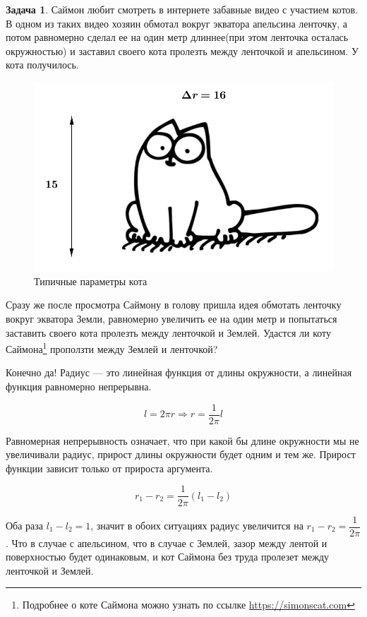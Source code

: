 \documentclass[pdftex, 12pt, a4paper]{article}
\theoremstyle{definition} %
\newtheorem{problem}{Задача}
\numberwithin{problem}{section}
\numberwithin{blits}{section}
\begin{document}
\begin{problem}
Саймон любит смотреть в интернете забавные видео с участием котов. В одном из таких видео хозяин обмотал вокруг экватора апельсина ленточку, а потом равномерно сделал ее на один метр длиннее(при этом ленточка осталась окружностью) и заставил своего кота пролезть между ленточкой и апельсином. У кота получилось.

\begin{figure}[H]
\begin{center}
\includegraphics[scale=1]{cat}
\caption{Типичные параметры кота}
\end{center}
\end{figure}

Сразу же после просмотра Саймону в голову пришла идея обмотать ленточку вокруг экватора Земли, равномерно увеличить ее на один метр и попытаться заставить своего кота пролезть между ленточкой и Землей. Удастся ли коту Саймона\footnote{Подробнее о коте Саймона можно узнать по ссылке \url{https://simonscat.com}} проползти между Землей и ленточкой?

\begin{sol}
Конечно да! Радиус --- это линейная функция от длины окружности, а линейная функция равномерно непрерывна.

\[l = 2 \pi r \Rightarrow r = \frac{1}{2 \pi} l \]

Равномерная непрерывность означает, что при какой бы длине окружности мы не увеличивали радиус, прирост длины окружности будет одним и тем же. Прирост функции зависит только от прироста аргумента.

\[r_1 - r_2 = \frac{1}{2\pi} (l_1 - l_2) \]

Оба раза $l_1 - l_2 = 1$, значит в обоих ситуациях радиус увеличится на $r_1 - r_2 = \dfrac{1}{2\pi}$. Что в случае с апельсином, что в случае с Землей, зазор между лентой и поверхностью будет одинаковым, и кот Саймона без труда пролезет между ленточкой и Землей.
\end{sol}
\end{problem}
\end{document}
